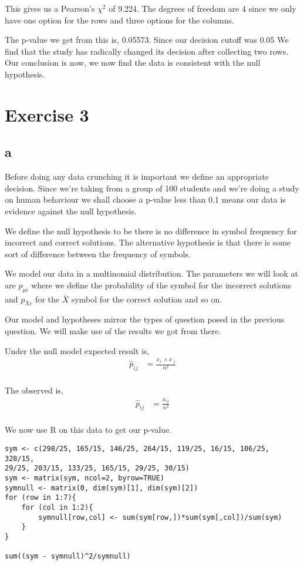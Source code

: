 \documentclass{article}
\begin{document}
This gives us a Pearson's $\chi^2$ of 9.224. The degrees of freedom are 4
since we only have one option for the rows and three options for the columns.

The p-value we get from this is, 0.05573. Since our decision cutoff was 0.05
We find that the study has radically changed its decision after
collecting two rows. Our conclusion is now, we now find the data 
is consistent with the null hypothesis.

\section{Exercise 3}
\subsection{a}
Before doing any data crunching it is important we define an appropriate
decision. Since we're taking from a group of 100 students and we're doing a
study on human behaviour we shall choose a p-value less than 0.1 means our data
is evidence against the null hypothesis.

We define the null hypothesis to be there is no difference in symbol frequency
for incorrect and correct solutions. The alternative hypothesis is that there is
some sort of difference between the frequency of symbols.

We model our data in a multinomial distribution.
The parameters we will look at are $p_{\mu i}$ where we define the probability
of the symbol for the incorrect solutions and $p_{\bar{X} c}$ for the $\bar{X}$
symbol for the correct solution and so on.

Our model and hypotheses mirror the types of question posed in the previous
question. We will make use of the results we got from there.

Under the null model expected result is,
\begin{align*}
    \hat{p}_{ij} &= \frac{x_{i.} \times x_{.j}}{n^2} \\
\end{align*}

The observed is,
\begin{align*}
    \hat{p}_{ij} &= \frac{x_{ij}}{n^2} \\
\end{align*}

We now use R on this data to get our p-value.
\begin{verbatim}
sym <- c(298/25, 165/15, 146/25, 264/15, 119/25, 16/15, 106/25, 328/15,
29/25, 203/15, 133/25, 165/15, 29/25, 30/15)
sym <- matrix(sym, ncol=2, byrow=TRUE)
symnull <- matrix(0, dim(sym)[1], dim(sym)[2])
for (row in 1:7){
    for (col in 1:2){
        symnull[row,col] <- sum(sym[row,])*sum(sym[,col])/sum(sym)
    }
}

sum((sym - symnull)^2/symnull)
\end{verbatim}
\end{document}
